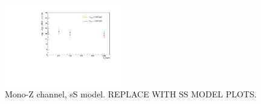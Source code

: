 \begin{figure}[!h]
\begin{center}
\includegraphics[width=0.45\textwidth]{figures/monoZ_sigma_limits_variedDMmass.pdf}
\caption{Mono-Z channel, sS model. REPLACE WITH SS MODEL PLOTS.}
\label{fig:MonoZ_SSD_limit}
\end{center}
\end{figure}

